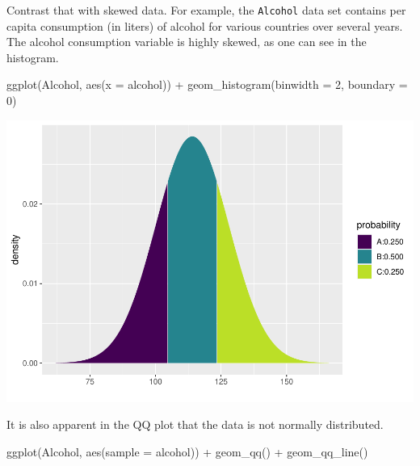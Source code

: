 \documentclass[
]{book}
\newenvironment{Shaded}{\begin{snugshade}}{\end{snugshade}}
\newcommand{\AttributeTok}[1]{\textcolor[rgb]{0.77,0.63,0.00}{#1}}
\newcommand{\DecValTok}[1]{\textcolor[rgb]{0.00,0.00,0.81}{#1}}
\newcommand{\FunctionTok}[1]{\textcolor[rgb]{0.00,0.00,0.00}{#1}}
\newcommand{\NormalTok}[1]{#1}
\newcommand{\SpecialCharTok}[1]{\textcolor[rgb]{0.00,0.00,0.00}{#1}}
\begin{document}
Contrast that with skewed data. For example, the \texttt{Alcohol} data set contains per capita consumption (in liters) of alcohol for various countries over several years. The alcohol consumption variable is highly skewed, as one can see in the histogram.

\begin{Shaded}
\begin{Highlighting}[]
\FunctionTok{ggplot}\NormalTok{(Alcohol, }\FunctionTok{aes}\NormalTok{(}\AttributeTok{x =}\NormalTok{ alcohol)) }\SpecialCharTok{+}
    \FunctionTok{geom\_histogram}\NormalTok{(}\AttributeTok{binwidth =} \DecValTok{2}\NormalTok{, }\AttributeTok{boundary =} \DecValTok{0}\NormalTok{)}
\end{Highlighting}
\end{Shaded}

\includegraphics{intro_stats_files/figure-latex/unnamed-chunk-359-1.pdf}

It is also apparent in the QQ plot that the data is not normally distributed.

\begin{Shaded}
\begin{Highlighting}[]
\FunctionTok{ggplot}\NormalTok{(Alcohol, }\FunctionTok{aes}\NormalTok{(}\AttributeTok{sample =}\NormalTok{ alcohol)) }\SpecialCharTok{+}
    \FunctionTok{geom\_qq}\NormalTok{() }\SpecialCharTok{+}
    \FunctionTok{geom\_qq\_line}\NormalTok{()}
\end{Highlighting}
\end{Shaded}
\end{document}
